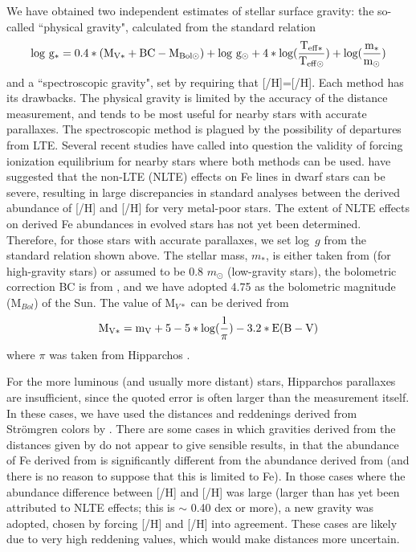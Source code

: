 \documentclass[12pt,preprint]{aastex}
\begin{document}
We have obtained two independent estimates of stellar surface gravity: the  so-called ``physical gravity",  calculated from the standard relation  
$$\rm{log}~g_*=0.4*(M_{V*}+BC-M_{Bol\odot})+log~g_{\odot} + 4*log (\frac{T_{eff *}}{T_{eff \odot}})+log(\frac{m_*}{m_{\odot}})$$
and a ``spectroscopic gravity",  set by requiring that [/H]=[/H].  Each method has its drawbacks.  The physical gravity is limited by the accuracy of the distance measurement, and tends to be most useful for nearby stars with accurate parallaxes.  The spectroscopic method is plagued by the possibility of departures from LTE.  Several recent studies have called into question the validity of forcing ionization equilibrium for nearby stars where both methods can be used.  \citet{Thevenin1999} have suggested that the non-LTE (NLTE) effects on Fe lines in dwarf stars can be severe, resulting in large discrepancies in standard analyses between the derived abundance of [/H] and [/H] for very metal-poor stars.  The extent of NLTE effects on derived Fe abundances in evolved stars has not yet been determined.  Therefore, for those stars with accurate parallaxes, we set log~$g$ from the standard relation shown above.  The stellar mass, $m_*$, is either taken from \citet{Carney1994} (for high-gravity stars) or assumed to be 0.8 $m_{\odot}$ (low-gravity stars), the bolometric correction BC is from \citet{BCdwarf, AlonsoGiant}, and we have adopted 4.75 as the bolometric magnitude (M$_{Bol}$) of the Sun.  The value of M$_{V*}$ can be derived from
$$\rm{M}_{V*}=\rm{m}_V + 5 -5*\rm{log}(\frac{1}{\pi}) - 3.2*E(B-V)$$  where $\pi$ was taken from Hipparchos  \citep{hipp}.  

For the more luminous (and usually more distant) stars, Hipparchos parallaxes are insufficient, since the quoted error is often larger than the measurement itself.  In these cases, we have used the distances and reddenings derived from Str\"{o}mgren colors by \citet{Twarog1994}.  There are some cases in which gravities derived from the distances given by \citet{Twarog1994} do not appear to give sensible results, in that the abundance of Fe derived from  is significantly different from the abundance derived from  (and there is no reason to suppose that this is limited to Fe).  In those cases where the abundance difference between [/H] and [/H] was large (larger than has yet been attributed to NLTE effects; this is $\sim$ 0.40 dex or more), a new gravity was adopted, chosen by forcing [/H] and [/H] into agreement.   These cases are likely due to very high reddening values, which would make \citet{Twarog1994} distances more uncertain.  
\end{document}
